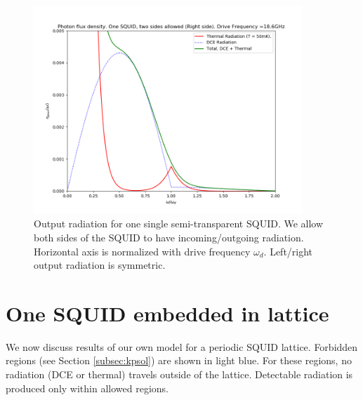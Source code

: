 \clearpage
%
\begin{figure}[h]
    \centering
    \includegraphics[width=0.9\textwidth, keepaspectratio]{figures/results/Naked_SQUID_right.png}
    \caption{Output radiation for one single semi-transparent SQUID. We allow both sides of the SQUID to have incoming/outgoing radiation. Horizontal axis is normalized with drive frequency $\omega_d$. Left/right output radiation is symmetric.}
    \label{fig:naked_SQUID}
\end{figure}
%
\clearpage
\newpage
\section{One SQUID embedded in lattice}\label{sec:results_one_active}
We now discuss results of our own model for a periodic SQUID lattice. Forbidden regions (see Section \ref{subsec:kpsol}) are shown in light blue. For these regions, no radiation (DCE or thermal) travels outside of the lattice. Detectable radiation is produced only within allowed regions.

